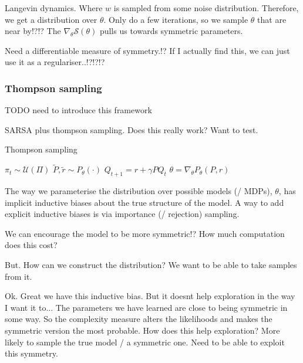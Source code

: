 Langevin dynamics. Where $w$ is sampled from some noise distribution.
Therefore, we get a distribution over $\theta$.
Only do a few iterations, so we sample $\theta$ that are near by!?!?
The $\nabla_\theta \mathcal S(\theta)$ pulls us towards symmetric parameters.

Need a differentiable measure of symmetry.!?
If I actually find this, we can just use it as a regulariser..!?!?!?


\subsubsection{Thompson sampling} \label{thompson-sampling}

{\color{red}TODO need to introduce this framework}

SARSA plus thompson sampling. Does this really work? Want to test.

\begin{algorithm}
	\caption{Thompson sampling}
	\begin{algorithmic}[1]

		\State $\pi_t \sim \mathcal U(\Pi)$
		\State $\tilde P, \tilde r \sim P_{\theta}(\cdot)$
		\State $Q_{t+1} =  r + \gamma P Q_t$ 
		\State $\theta = \nabla_{\theta} P_{\theta}(P, r)$ 

		\EndWhile
		\State \algorithmicreturn{ $\pi$}
		\EndProcedure

	\end{algorithmic}
\end{algorithm}

The way we parameterise the distribution over possible models (/ MDPs), $\theta$, has implicit inductive biases about the true structure of the model.
A way to add explicit inductive biases is via importance (/ rejection) sampling.

We can encourage the model to be more symmetric!?
How much computation does this cost?

But. How can we construct the distribution? We want to be able to take samples
from it.

Ok. Great we have this inductive bias. But it doesnt help exploration in the way I want it to...
The parameters we have learned are close to being symmetric in some way. So the complexity measure alters the likelihoods and makes the symmetric version the most probable.
How does this help exploration? More likely to sample the true model / a symmetric one. Need to be able to exploit this symmetry.

